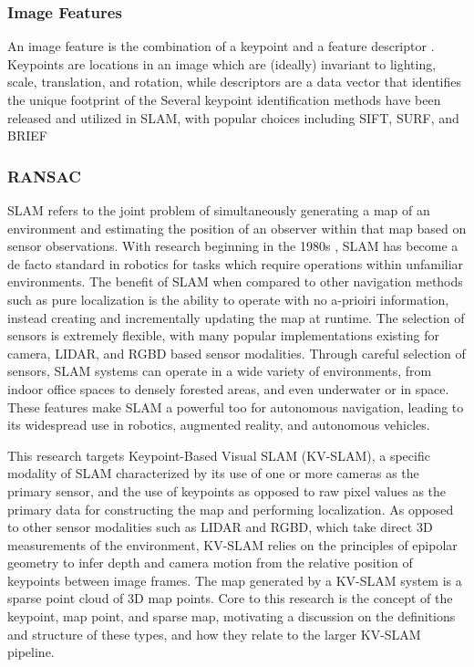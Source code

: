 \subsubsection{Image Features}

An image feature is the combination of a keypoint and a feature descriptor \cite{loweObjectRecognitionLocal1999}. Keypoints are locations in an image which are (ideally) invariant to lighting, scale, translation, and rotation\cite{shiGoodFeaturesTrack1994}, while descriptors are a data vector that identifies the unique footprint of the Several keypoint identification methods have been released and utilized in SLAM, with popular choices including SIFT\cite{loweObjectRecognitionLocal1999}, SURF\cite{baySURFSpeededRobust2006}, and BRIEF \cite{calonderBRIEFBinaryRobust2010} 

\subsubsection{RANSAC}

SLAM refers to the joint problem of simultaneously generating a map of an environment and estimating the position of an observer within that map based on sensor observations. With research beginning in the 1980s \cite{smithEstimatingUncertainSpatial1988}, SLAM has become a de facto standard in robotics for tasks which require operations within unfamiliar environments. The benefit of SLAM when compared to other navigation methods such as pure localization is the ability to operate with no a-prioiri information, instead creating and incrementally updating the map at runtime. The selection of sensors is extremely flexible, with many popular implementations existing for camera, LIDAR, and RGBD based sensor modalities. Through careful selection of sensors, SLAM systems can operate in a wide variety of environments, from indoor office spaces to densely forested areas, and even underwater or in space.  These features make SLAM a powerful too for autonomous navigation, leading to its widespread use in robotics, augmented reality, and autonomous vehicles.

This research targets Keypoint-Based Visual SLAM (KV-SLAM), a specific modality of SLAM characterized by its use of one or more cameras as the primary sensor, and the use of keypoints as opposed to raw pixel values as the primary data for constructing the map and performing localization. As opposed to other sensor modalities such as LIDAR and RGBD, which take direct 3D measurements of the environment, KV-SLAM relies on the principles of epipolar geometry to infer depth and camera motion from the relative position of keypoints between image frames. The map generated by a KV-SLAM system is a sparse point cloud of 3D map points. Core to this research is the concept of the keypoint, map point, and sparse map, motivating a discussion on the definitions and structure of these types, and how they relate to the larger KV-SLAM pipeline.



